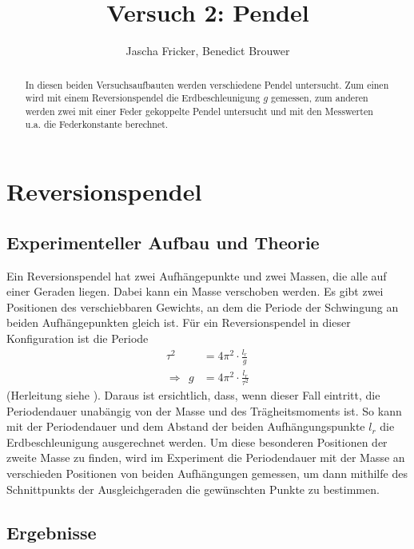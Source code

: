 \documentclass[11pt, a4paper]{article}
\title{Versuch 2: Pendel}
\author{Jascha Fricker, Benedict Brouwer}
\begin{document}
    \maketitle

    

    \begin{abstract}
        In diesen beiden Versuchsaufbauten werden verschiedene Pendel untersucht. Zum einen wird mit
        einem Reversionspendel die Erdbeschleunigung $g$ gemessen, zum anderen werden zwei mit einer Feder
        gekoppelte Pendel untersucht und mit den Messwerten u.a. die Federkonstante berechnet. 
    \end{abstract}

    \tableofcontents

    \section{Reversionspendel}

    \subsection{Experimenteller Aufbau und Theorie}

    Ein Reversionspendel hat zwei Aufhängepunkte und zwei Massen, die alle auf einer Geraden liegen.
    Dabei kann ein Masse verschoben werden.
    Es gibt zwei Positionen des verschiebbaren Gewichts, an dem die Periode der Schwingung an beiden
    Aufhängepunkten gleich ist. Für ein Reversionspendel in dieser Konfiguration ist die Periode
    \begin{align}
         \tau^2 &= 4\pi^2 \cdot \frac{l_r}{g} \\
        \Rightarrow \ \ g &= 4\pi^2 \cdot \frac{l_r}{\tau^2} \label{gformel}
    \end{align}
    (Herleitung siehe \cite[Abschitt 1.3]{pen}). Daraus ist ersichtlich, dass, wenn dieser Fall eintritt, die Periodendauer unabängig von der Masse und des
    Trägheitsmoments ist. So kann mit der Periodendauer und dem Abstand der beiden Aufhängungspunkte $l_r$
    die Erdbeschleunigung ausgerechnet werden.
    Um diese besonderen Positionen der zweite Masse zu finden, wird im Experiment die Periodendauer
    mit der Masse an verschieden Positionen von beiden Aufhängungen gemessen,
    um dann mithilfe des Schnittpunkts der Ausgleichgeraden die gewünschten
    Punkte  zu bestimmen.



    \subsection{Ergebnisse}
\end{document}
